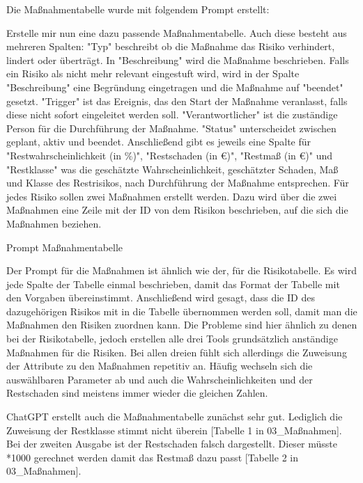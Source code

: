 Die Maßnahmentabelle wurde mit folgendem Prompt erstellt:

\begin{prompt}[H]
    \begin{tcolorbox}[colback=gray!20, colframe=gray!20, boxrule=0pt, sharp corners] 
        Erstelle mir nun eine dazu passende Maßnahmentabelle. Auch diese besteht aus mehreren Spalten: "Typ" beschreibt 
        ob die Maßnahme das Risiko verhindert, lindert oder überträgt. In "Beschreibung" wird die Maßnahme beschrieben. 
        Falls ein Risiko als nicht mehr relevant eingestuft wird, wird in der Spalte "Beschreibung" eine Begründung 
        eingetragen und die Maßnahme auf "beendet" gesetzt. "Trigger" ist das Ereignis, das den Start der Maßnahme 
        veranlasst, falls diese nicht sofort eingeleitet werden soll. "Verantwortlicher" ist die zuständige Person für 
        die Durchführung der Maßnahme. "Status" unterscheidet zwischen geplant, aktiv und beendet. Anschließend gibt es 
        jeweils eine Spalte für "Restwahrscheinlichkeit (in \%)", "Restschaden (in €)", "Restmaß (in €)" und "Restklasse" 
        was die geschätzte Wahrscheinlichkeit, geschätzter Schaden, Maß und Klasse des Restrisikos, nach Durchführung der 
        Maßnahme entsprechen. Für jedes Risiko sollen zwei Maßnahmen erstellt werden. Dazu wird über die zwei Maßnahmen 
        eine Zeile mit der ID von dem Risikon beschrieben, auf die sich die Maßnahmen beziehen.
        \vfill
    \end{tcolorbox}
    \caption{Prompt Maßnahmentabelle}
    \label{Prompt Maßnahmentabelle}
\end{prompt}

Der Prompt für die Maßnahmen ist ähnlich wie der, für die Risikotabelle. Es wird jede Spalte der Tabelle einmal beschrieben,
damit das Format der Tabelle mit den Vorgaben übereinstimmt. Anschließend wird gesagt, dass die ID des dazugehörigen Risikos
mit in die Tabelle übernommen werden soll, damit man die Maßnahmen den Risiken zuordnen kann. Die Probleme sind hier 
ähnlich zu denen bei der Risikotabelle, jedoch erstellen alle drei Tools grundsätzlich anständige Maßnahmen für die Risiken.
Bei allen dreien fühlt sich allerdings die Zuweisung der Attribute zu den Maßnahmen repetitiv an. Häufig wechseln sich die 
auswählbaren Parameter ab und auch die Wahrscheinlichkeiten und der Restschaden sind meistens immer wieder die gleichen Zahlen.

ChatGPT erstellt auch die Maßnahmentabelle zunächst sehr gut. Lediglich die Zuweisung der Restklasse stimmt nicht überein 
[Tabelle 1 in 03\_Maßnahmen]. Bei der zweiten Ausgabe ist der Restschaden falsch dargestellt. Dieser müsste *1000 gerechnet 
werden damit das Restmaß dazu passt [Tabelle 2 in 03\_Maßnahmen].

